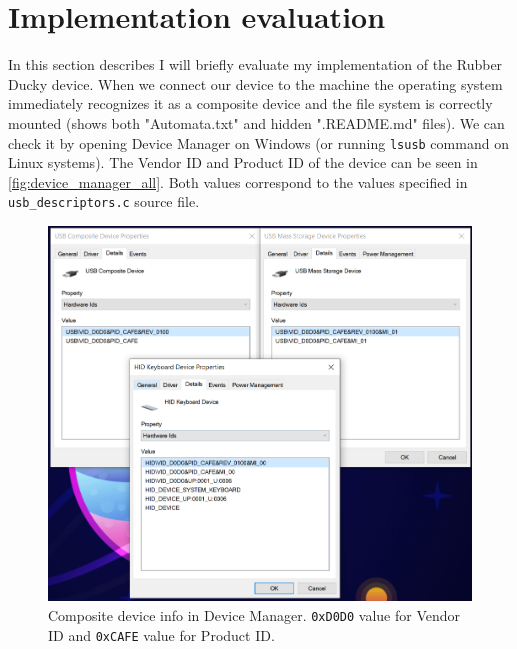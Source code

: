 \chapter{Implementation evaluation}
\label{ch:evaluation}
In this section describes I will briefly evaluate my implementation of the Rubber Ducky device. When we connect our device to the machine the operating system immediately recognizes it as a composite device and the file system is correctly mounted (shows both "Automata.txt" and hidden ".README.md" files). We can check it by opening Device Manager on Windows (or running \verb|lsusb| command on Linux systems). The Vendor ID and Product ID of the device can be seen in \autoref{fig:device_manager_all}. Both values correspond to the values specified in \verb|usb_descriptors.c| source file.
\begin{figure}[ht]
    \centering
    \includegraphics[width=0.75\linewidth]{./obrazky-figures/device_manager_all.png}
    \caption{Composite device info in Device Manager. \texttt{0xD0D0} value for Vendor ID and \texttt{0xCAFE} value for Product ID.}
    \label{fig:device_manager_all}
\end{figure}


